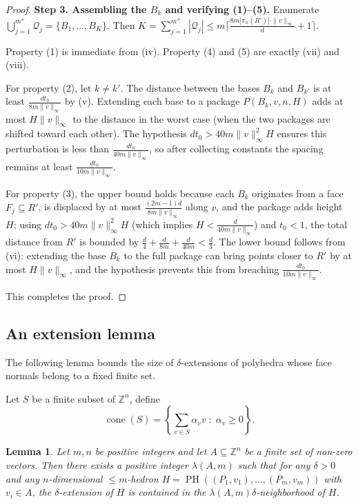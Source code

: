 \documentclass[10pt,a4paper]{amsart}
\newtheorem{lemma}[theorem]{Lemma}
\newcommand{\Z}{\mathbb Z}
\begin{document}
\begin{proof}
\medskip\noindent
\textbf{Step 3.  Assembling the $B_k$ and verifying (1)--(5).}
Enumerate $\bigcup_{j=1}^{m''}\mathcal{Q}_j=\{B_1,\dots,B_K\}$.  Then
$K=\sum_{j=1}^{m''}|\mathcal{Q}_j|
\leq m\bigl\lceil\frac{8m|\pi_n(R')|\cdot\|v\|_\infty}{d}+1\bigr\rceil$.

Property (1) is immediate from (iv).  Property (4) and (5) are exactly (vii) and (viii).

For property (2), let $k\neq k'$.  The distance between the bases $B_k$ and
$B_{k'}$ is at least $\frac{d t_0}{8m\|v\|_\infty}$ by (v).  Extending each
base to a package $P(B_k,v,n,H)$ adds at most $H\|v\|_\infty$ to the distance
in the worst case (when the two packages are shifted toward each other).  The
hypothesis $d t_0>40m\|v\|_\infty^2 H$ ensures this perturbation is less than
$\frac{d t_0}{40m\|v\|_\infty}$, so after collecting constants the spacing
remains at least $\frac{d t_0}{10m\|v\|_\infty}$.

For property (3), the upper bound holds because each $B_k$ originates from a
face $F_j\subseteq R'$, is displaced by at most
$\frac{(2m-1)d}{8m\|v\|_\infty}$ along $v$, and the package adds height
$H$; using $d t_0>40m\|v\|_\infty^2 H$ (which implies
$H<\frac{d}{40m\|v\|_\infty}$) and $t_0<1$, the total distance from $R'$ is
bounded by $\frac{d}{4}+\frac{d}{8m}+\frac{d}{40m}<\frac{d}{3}$.  The lower
bound follows from (vi): extending the base $B_k$ to the full package can
bring points closer to $R'$ by at most $H\|v\|_\infty$, and the hypothesis
prevents this from breaching $\frac{d t_0}{10m\|v\|_\infty}$.

This completes the proof.
\end{proof}

\subsection{An extension lemma}

The following lemma bounds the size of $\delta$-extensions of polyhedra
whose face normals belong to a fixed finite set.

Let $S$ be a finite subset of $\Z^n$, define 
$$\operatorname{cone}(S) = \left\{ \sum_{v \in S} \alpha_v v \;:\; \alpha_v \ge 0 \right\}.$$

\begin{lemma}\label{lem:extension}
Let $m, n$ be positive integers and let $A\subseteq\mathbb{Z}^n$ be a
finite set of non-zero vectors. Then there exists a positive integer
$\lambda(A,m)$ such that for any $\delta>0$ and any $n$-dimensional $\leq\!\! m$-hedron
$H=\operatorname{PH}((P_1,v_1),\dots,(P_m,v_m))$ with $v_i\in A$, the
$\delta$-extension of $H$ is contained in the
$\lambda(A,m)\delta$-neighborhood of $H$.
\end{lemma}
\end{document}
